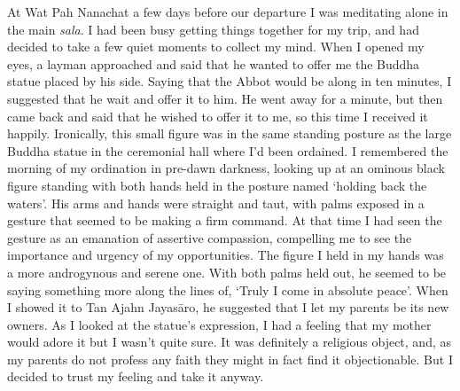 At Wat Pah Nanachat a few days before our departure I was meditating
alone in the main \emph{sala}. I had been busy getting things together
for my trip, and had decided to take a few quiet moments to collect my
mind. When I opened my eyes, a layman approached and said that he wanted
to offer me the Buddha statue placed by his side. Saying that the Abbot
would be along in ten minutes, I suggested that he wait and offer it to
him. He went away for a minute, but then came back and said that he
wished to offer it to me, so this time I received it happily. 
Ironically, this small figure was in the same standing posture as the
large Buddha statue in the ceremonial hall where I'd been ordained. I
remembered the morning of my ordination in pre-dawn darkness, looking up
at an ominous black figure standing with both hands held in the posture
named `holding back the waters'. His arms and hands were straight and
taut, with palms exposed in a gesture that seemed to be making a firm
command. At that time I had seen the gesture as an emanation of
assertive compassion, compelling me to see the importance and urgency of
my opportunities. The figure I held in my hands was a more androgynous
and serene one. With both palms held out, he seemed to be saying
something more along the lines of, `Truly I come in absolute peace'. 
When I showed it to Tan Ajahn Jayasāro, he suggested that I let my
parents be its new owners. As I looked at the statue's expression, I had
a feeling that my mother would adore it but I wasn't quite sure. It was
definitely a religious object, and, as my parents do not profess any
faith they might in fact find it objectionable. But I decided to trust
my feeling and take it anyway. 

